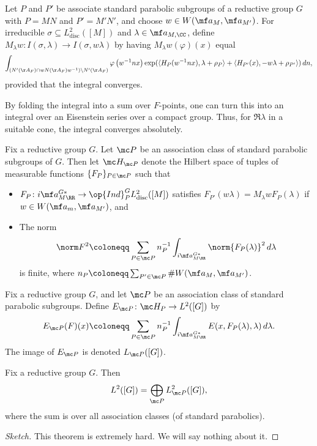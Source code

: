\documentclass{article}
\begin{document}
\begin{definition}
	Let $P$ and $P'$ be associate standard parabolic subgroups of a reductive group $G$ with $P=MN$ and $P'=M'N'$, and choose $w\in W(\mf a_M,\mf a_{M'})$. For irreducible $\sigma\subseteq L^2_{\mathrm{disc}}([M])$ and $\lambda\in\mf a_{M,\CC}$, define $M_\lambda w\colon I(\sigma,\lambda)\to I(\sigma,w\lambda)$ by having $M_\lambda w(\varphi)(x)$ equal
	\[\int_{\left(N'(\AA_F)\cap wN(\AA_F)w^{-1}\right)\backslash N'(\AA_F)}\varphi\left(w^{-1}nx\right)\exp(\langle H_P(w^{-1}nx),\lambda+\rho_P\rangle+\langle H_{P'}(x),-w\lambda+\rho_{P'}\rangle)\,dn,\]
	provided that the integral converges.
\end{definition}
\begin{remark}
	By folding the integral into a sum over $F$-points, one can turn this into an integral over an Eisenstein series over a compact group. Thus, for $\Re\lambda$ in a suitable cone, the integral converges absolutely.
\end{remark}
\begin{notation}
	Fix a reductive group $G$. Let $\mc P$ be an association class of standard parabolic subgroups of $G$. Then let $\mc H_{\mc P}$ denote the Hilbert space of tuples of measurable functions $\{F_P\}_{P\in\mc P}$ such that
	\begin{itemize}
		\item $F_P\colon i\mf a_{M\RR}^{G*}\to\op{Ind}_P^GL^2_{\mathrm{disc}}([M])$ satisfies $F_{P'}(w\lambda)=M_\lambda wF_P(\lambda)$ if $w\in W(\mf a_m,\mf a_{M'})$, and
		\item The norm
		\[\norm F^2\coloneqq\sum_{P\in\mc P}n_{P}^{-1}\int_{i\mf a^{G*}_{M\RR}}\norm{F_P(\lambda)}^2\,d\lambda\]
		is finite, where $n_P\coloneqq\sum_{P'\in\mc P}\#W(\mf a_M,\mf a_{M'})$.
	\end{itemize}
\end{notation}
\begin{notation}
	Fix a reductive group $G$, and let $\mc P$ be an association class of standard parabolic subgroups. Define $E_{\mc P}\colon\mc H_P\to L^2([G])$ by
	\[E_{\mc P}(F)(x)\coloneqq\sum_{P\in\mc P}n_P^{-1}\int_{i\mf a_{M\RR}^{G*}}E(x,F_P(\lambda),\lambda)\,d\lambda.\]
	The image of $E_{\mc P}$ is denoted $L_{\mc P}([G])$.
\end{notation}
\begin{theorem}[Langlands]
	Fix a reductive group $G$. Then
	\[L^2([G])=\bigoplus_{\mc P}L^2_{\mc P}([G]),\]
	where the sum is over all association classes (of standard parabolics).
\end{theorem}
\begin{proof}[Sketch]
	This theorem is extremely hard. We will say nothing about it.
\end{proof}
\end{document}
